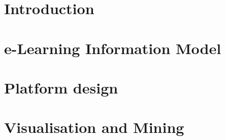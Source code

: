 \documentclass[10pt,twocolumn]{IEEEtran}
\begin{document}




\section{Introduction} %
\label{intro}



\section{e-Learning Information Model} %
\label{model}


\section{Platform design} %
\label{architecture}



\section{Visualisation and Mining} %
\label{visualisation}


%

%
\end{document}
